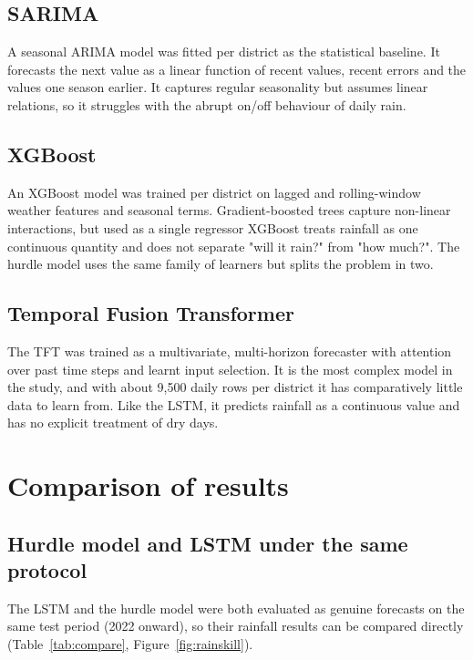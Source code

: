 \subsection{SARIMA}
A seasonal ARIMA model \cite{box2015time} was fitted per district as the statistical baseline. It forecasts the next value as a linear function of recent values, recent errors and the values one season earlier. It captures regular seasonality but assumes linear relations, so it struggles with the abrupt on/off behaviour of daily rain.

\subsection{XGBoost}
An XGBoost model \cite{chen2016xgboost} was trained per district on lagged and rolling-window weather features and seasonal terms. Gradient-boosted trees capture non-linear interactions, but used as a single regressor XGBoost treats rainfall as one continuous quantity and does not separate "will it rain?" from "how much?". The hurdle model uses the same family of learners but splits the problem in two.

\subsection{Temporal Fusion Transformer}
The TFT \cite{lim2021temporal} was trained as a multivariate, multi-horizon forecaster with attention over past time steps and learnt input selection. It is the most complex model in the study, and with about 9,500 daily rows per district it has comparatively little data to learn from. Like the LSTM, it predicts rainfall as a continuous value and has no explicit treatment of dry days.

\section{Comparison of results}
\subsection{Hurdle model and LSTM under the same protocol}
The LSTM and the hurdle model were both evaluated as genuine forecasts on the same test period (2022 onward), so their rainfall results can be compared directly (Table~\ref{tab:compare}, Figure~\ref{fig:rainskill}).

